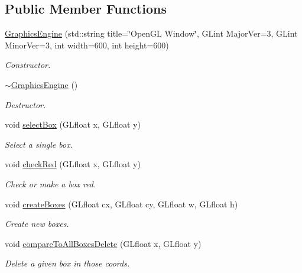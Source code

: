 \subsection*{Public Member Functions}
\begin{DoxyCompactItemize}
\item 
\hyperlink{class_graphics_engine_a458fa2b36f864e0820a0a54ad58ff1c3}{Graphics\+Engine} (std\+::string title=\char`\"{}Open\+GL Window\char`\"{}, G\+Lint Major\+Ver=3, G\+Lint Minor\+Ver=3, int width=600, int height=600)
\begin{DoxyCompactList}\small\item\em Constructor. \end{DoxyCompactList}\item 
\hyperlink{class_graphics_engine_ab67afeefbc9f1c284f6ce310c31ae8f6}{$\sim$\+Graphics\+Engine} ()
\begin{DoxyCompactList}\small\item\em Destructor. \end{DoxyCompactList}\item 
void \hyperlink{class_graphics_engine_a02f488184662f6bedacfb77f38a6da64}{select\+Box} (G\+Lfloat x, G\+Lfloat y)
\begin{DoxyCompactList}\small\item\em Select a single box. \end{DoxyCompactList}\item 
void \hyperlink{class_graphics_engine_a2ff9c9a258f4ba3295c89dc1ae5dc4b1}{check\+Red} (G\+Lfloat x, G\+Lfloat y)
\begin{DoxyCompactList}\small\item\em Check or make a box red. \end{DoxyCompactList}\item 
void \hyperlink{class_graphics_engine_adf448561f5df07f42050cb0f5483eacd}{create\+Boxes} (G\+Lfloat cx, G\+Lfloat cy, G\+Lfloat w, G\+Lfloat h)
\begin{DoxyCompactList}\small\item\em Create new boxes. \end{DoxyCompactList}\item 
void \hyperlink{class_graphics_engine_add65dfb7d27e2aae2344240a45dd45a0}{compare\+To\+All\+Boxes\+Delete} (G\+Lfloat x, G\+Lfloat y)
\begin{DoxyCompactList}\small\item\em Delete a given box in those coords. \end{DoxyCompactList}\item 

\end{DoxyCompactItemize}
